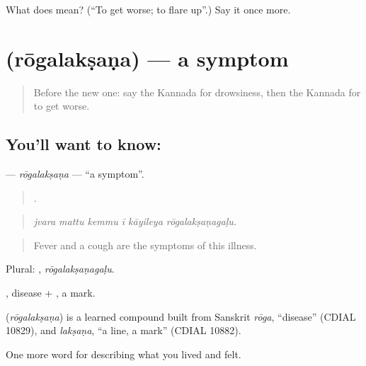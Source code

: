 \begin{tcolorbox}[breakable,colback=teal!4,colframe=teal!35!black,title={Before you move on}]
What does  mean? (\textquotedblleft{}To get worse; to flare up\textquotedblright{}.) Say it once more.
\end{tcolorbox}
\section[\texorpdfstring{\kn{ರೋಗಲಕ್ಷಣ} (rōgalakṣaṇa)}{ರೋಗಲಕ್ಷಣ (rōgalakṣaṇa)}]{ (rōgalakṣaṇa) — a symptom}

\label{lesson:KA-C511-rogalaksana}



\begin{quote}
Before the new one: say the Kannada for drowsiness, then the Kannada for to get worse.
\end{quote}

\subsection*{You'll want to know: }
\textbf{} — \emph{rōgalakṣaṇa} — \textquotedblleft{}a symptom\textquotedblright{}.

\begin{quote}
     .
\end{quote}

\begin{quote}
\emph{jvara mattu kemmu ī kāyileya rōgalakṣaṇagaḷu.}
\end{quote}

\begin{quote}
Fever and a cough are the symptoms of this illness.
\end{quote}

Plural: , \emph{rōgalakṣaṇagaḷu}.

, disease + , a mark.

\begin{cousinweb}
\textbf{} (\emph{rōgalakṣaṇa}) is a learned compound built from Sanskrit \emph{rōga}, \textquotedblleft{}disease\textquotedblright{} (CDIAL 10829), and \emph{lakṣaṇa}, \textquotedblleft{}a line, a mark\textquotedblright{} (CDIAL 10882).
\end{cousinweb}

\begin{grammarlens}[title={What you've built}]
One more word for describing what you lived and felt.
\end{grammarlens}

